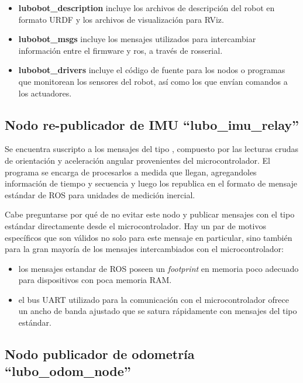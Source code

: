 \begin{itemize}
  \item \textbf{lubobot\_description} incluye los archivos de descripción del robot en formato URDF y los archivos de visualización para RViz.
  \item \textbf{lubobot\_msgs} incluye los mensajes utilizados para intercambiar información entre el firmware y ros, a través de rosserial.
  \item \textbf{lubobot\_drivers} incluye el código de fuente para los nodos o programas que monitorean los sensores del robot, así como los que envían comandos a los actuadores.
\end{itemize}

\subsection{Nodo re-publicador de IMU ``lubo\_imu\_relay''}

Se encuentra suscripto a los mensajes del tipo , compuesto por las lecturas crudas de orientación y aceleración angular provenientes del microcontrolador. El programa se encarga de procesarlos a medida que llegan, agregandoles información de tiempo y secuencia y luego los republica en el formato de mensaje estándar de ROS para unidades de medición inercial\protect\footnotemark.

Cabe preguntarse por qué de no evitar este nodo y publicar mensajes con el tipo estándar directamente desde el microcontrolador. Hay un par de motivos específicos que son válidos no solo para este mensaje en particular, sino también para la gran mayoría de los mensajes intercambiados con el microcontrolador:
\begin{itemize}
  \item los mensajes estandar de ROS poseen un \textit{footprint} en memoria poco adecuado para dispositivos con poca memoria RAM.
  \item el bus UART utilizado para la comunicación con el microcontrolador ofrece un ancho de banda ajustado que se satura rápidamente con mensajes del tipo estándar.
\end{itemize}


\subsection{Nodo publicador de odometría ``lubo\_odom\_node''}

